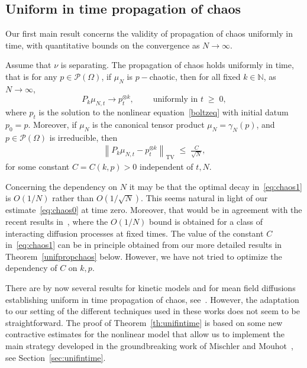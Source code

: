 \documentclass[AHL,Unicode,longabstracts,published]{cedram}
\renewcommand{\leq}{\;\leqslant\;}
\renewcommand{\geq}{\;\geqslant\;}
\newcommand{\tv}{\mathrm{TV}}
\newcommand{\cP}{\mathcal{P}}
\newcommand{\bbN}{\mathbb{N}}
\let\O=\Omega
\begin{document}
\subsection{Uniform in time propagation of chaos}

Our first main result concerns the validity of propagation of chaos uniformly in time, with quantitative bounds on the convergence as $N\to\infty$.

\begin{theo}\label{th:unifintime}
Assume that $\nu$ is separating. The propagation of chaos holds uniformly in time, that is for any $p\in\cP(\O)$, if $\mu_{N}$ is $p-$chaotic, then for all fixed $k \in \bbN$, as $N\to\infty$,
\[
P_k\mu_{N,t}\longrightarrow p_t^{\otimes k},\qquad \; \text{uniformly in $t\geq 0$},
\]
where $p_t$ is the solution to the nonlinear equation~\eqref{boltzeq} with initial datum $p_0=p$.
Moreover, if $\mu_{N}$ is the canonical tensor product $\mu_{N}=\gamma_N(p)$, and $p\in\cP(\O)$ is irreducible, then
\begin{align}\label{eq:chaos1}
\left\|P_k\mu_{N,t}-p_t^{\otimes k}\right\|_\tv \leq \frac{C}{\sqrt{N}},
\end{align}
for some constant $C=C(k,p)>0$ independent of $t,N$.
\end{theo}

\begin{rema}
Concerning the dependency on $N$ it may be that the optimal decay in~\eqref{eq:chaos1} is $O(1/N)$ rather than $O(1/\sqrt N)$. This seems natural in light of our estimate~\eqref{eq:chaos0} at time zero. Moreover, that would be in agreement with the recent results in~\cite{lacker}, where the $O(1/N)$ bound is obtained for a class of interacting diffusion processes at fixed times. The value of the constant $C$ in~\eqref{eq:chaos1} can be in principle obtained from our more detailed results in Theorem~\ref{unifpropchaos} below. However, we have not tried to optimize the dependency of $C$ on $k,p$.
\end{rema}

There are by now several results for kinetic models and for mean field diffusions establishing uniform in time propagation of chaos, see~\cite{revchaos,DelMoralGuionnet,cattiaux,
elementary}. However, the adaptation to our setting of the different techniques used in these works does not seem to be straightforward. The proof of Theorem~\ref{th:unifintime} is based on some new contractive estimates for the nonlinear model that allow us to implement the main strategy developed in the groundbreaking work of Mischler and Mouhot~\cite{kacsprog}, see Section~\ref{sec:unifintime}.
\end{document}
